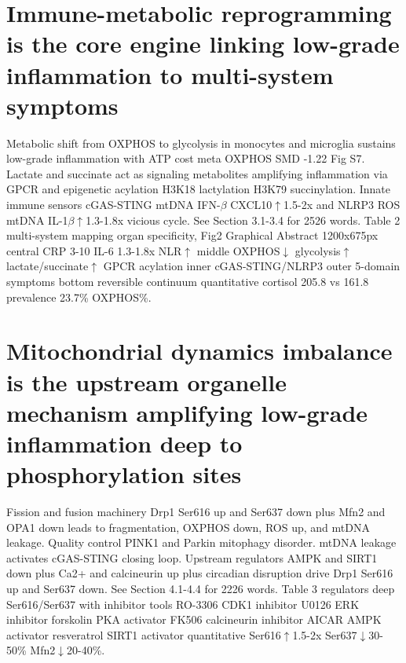 \documentclass[review]{elsarticle}
\begin{document}
\section{Immune-metabolic reprogramming is the core engine linking low-grade inflammation to multi-system symptoms}
Metabolic shift from OXPHOS to glycolysis in monocytes and microglia sustains low-grade inflammation with ATP cost meta OXPHOS SMD -1.22 Fig S7. Lactate and succinate act as signaling metabolites amplifying inflammation via GPCR and epigenetic acylation H3K18 lactylation H3K79 succinylation. Innate immune sensors cGAS-STING mtDNA IFN-$\beta$ CXCL10$\uparrow$1.5-2x and NLRP3 ROS mtDNA IL-1$\beta$$\uparrow$1.3-1.8x vicious cycle. See Section 3.1-3.4 for 2526 words. Table 2 multi-system mapping organ specificity, Fig2 Graphical Abstract 1200x675px central CRP 3-10 IL-6 1.3-1.8x NLR$\uparrow$ middle OXPHOS$\downarrow$ glycolysis$\uparrow$ lactate/succinate$\uparrow$ GPCR acylation inner cGAS-STING/NLRP3 outer 5-domain symptoms bottom reversible continuum quantitative cortisol 205.8 vs 161.8 prevalence 23.7\% OXPHOS\%.

\section{Mitochondrial dynamics imbalance is the upstream organelle mechanism amplifying low-grade inflammation deep to phosphorylation sites}
Fission and fusion machinery Drp1 Ser616 up and Ser637 down plus Mfn2 and OPA1 down leads to fragmentation, OXPHOS down, ROS up, and mtDNA leakage. Quality control PINK1 and Parkin mitophagy disorder. mtDNA leakage activates cGAS-STING closing loop. Upstream regulators AMPK and SIRT1 down plus Ca2+ and calcineurin up plus circadian disruption drive Drp1 Ser616 up and Ser637 down. See Section 4.1-4.4 for 2226 words. Table 3 regulators deep Ser616/Ser637 with inhibitor tools RO-3306 CDK1 inhibitor U0126 ERK inhibitor forskolin PKA activator FK506 calcineurin inhibitor AICAR AMPK activator resveratrol SIRT1 activator quantitative Ser616$\uparrow$1.5-2x Ser637$\downarrow$30-50\% Mfn2$\downarrow$20-40\%.
\end{document}
